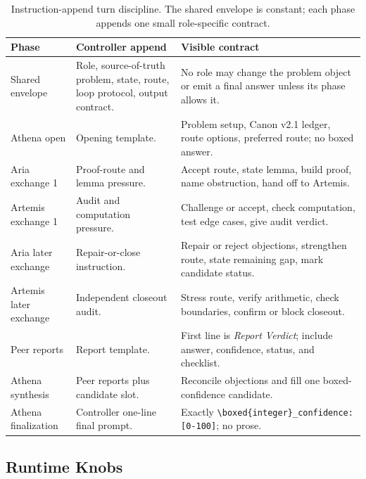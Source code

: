 \documentclass[11pt]{article}
\newcommand{\athena}{Athena}
\newcommand{\aria}{Aria}
\newcommand{\artemis}{Artemis}
\begin{document}
\begin{table}[H]
\centering
\footnotesize
\setlength{\tabcolsep}{5pt}
\renewcommand{\arraystretch}{1.16}
\begin{tabularx}{\textwidth}{>{\raggedright\arraybackslash}p{}>{\raggedright\arraybackslash}p{}X}
\toprule
Phase & Controller append & Visible contract \\
\midrule
Shared envelope & Role, source-of-truth problem, state, route, loop protocol, output contract. & No role may change the problem object or emit a final answer unless its phase allows it. \\
\athena{} open & Opening template. & Problem setup, Canon v2.1 ledger, route options, preferred route; no boxed answer. \\
\aria{} exchange 1 & Proof-route and lemma pressure. & Accept route, state lemma, build proof, name obstruction, hand off to \artemis{}. \\
\artemis{} exchange 1 & Audit and computation pressure. & Challenge or accept, check computation, test edge cases, give audit verdict. \\
\aria{} later exchange & Repair-or-close instruction. & Repair or reject objections, strengthen route, state remaining gap, mark candidate status. \\
\artemis{} later exchange & Independent closeout audit. & Stress route, verify arithmetic, check boundaries, confirm or block closeout. \\
Peer reports & Report template. & First line is \textit{Report Verdict}; include answer, confidence, status, and checklist. \\
\athena{} synthesis & Peer reports plus candidate slot. & Reconcile objections and fill one boxed-confidence candidate. \\
\athena{} finalization & Controller one-line final prompt. & Exactly \texttt{\textbackslash boxed\{integer\}\_confidence:[0-100]}; no prose. \\
\bottomrule
\end{tabularx}
\caption{Instruction-append turn discipline. The shared envelope is constant; each phase appends one small role-specific contract.}
\label{tab:instruction-append-turn-discipline}
\end{table}

\subsection{Runtime Knobs}
\end{document}
